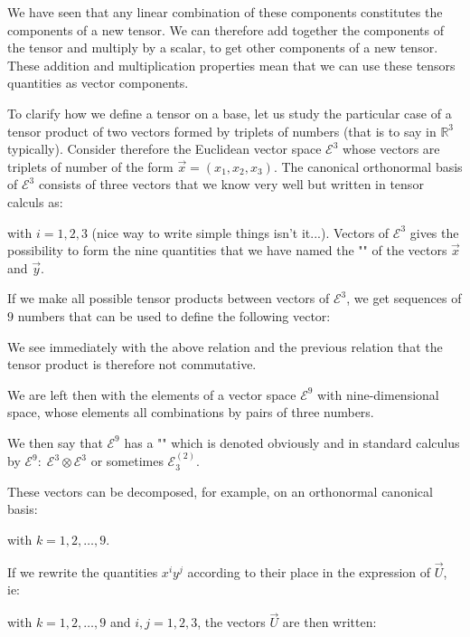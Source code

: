 	We have seen that any linear combination of these components constitutes the components of a new tensor. We can therefore add together the components of the tensor and multiply by a scalar, to get other components of a new tensor. These addition and multiplication properties mean that we can use these tensors quantities as vector components.
	
	To clarify how we define a tensor on a base, let us study the particular case of a tensor product of two vectors formed by triplets of numbers (that is to say in $\mathbb{R}^3$ typically). Consider therefore the Euclidean vector space $\mathcal{E}^3$ whose vectors are triplets of number of the form $\vec{x}=(x_1,x_2,x_3)$. The canonical orthonormal basis of $\mathcal{E}^3$ consists of three vectors that we know very well but written in tensor calculs as:
	
	with $i=1,2,3$ (nice way to write simple things isn't it...).
	Vectors of $\mathcal{E}^3$ gives the possibility to form the nine quantities that we have named the "" of the vectors $\vec{x}$ and $\vec{y}$.
	
	If we make all possible tensor products between vectors of $\mathcal{E}^3$, we get sequences of $9$ numbers that can be used to define the following vector:
		
	\begin{tcolorbox}[title=Remark,colframe=black,arc=10pt]
	We see immediately with the above relation and the previous relation that the tensor product is therefore not commutative.
	\end{tcolorbox}
	We are left then with the elements of a vector space $\mathcal{E}^9$ with nine-dimensional space, whose elements all combinations by pairs of three numbers.
	
	We then say that $\mathcal{E}^9$ has a "" which is denoted obviously and in standard calculus by $\mathcal{E}^9:\; \mathcal{E}^3\otimes \mathcal{E}^3$ or sometimes $\mathcal{E}_3^{(2)}$.

	These vectors can be decomposed, for example, on an orthonormal canonical basis:
	
	with $k=1,2,\ldots,9$.

	If we rewrite the quantities $x^iy^j$ according to their place in the expression of $\vec{U}$, ie:
	
	with $k=1,2,\ldots,9$ and $i,j=1,2,3$, the vectors $\vec{U}$ are then written:
	
